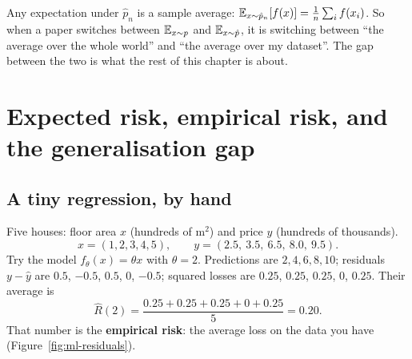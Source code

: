 \begin{intuitionbox}
Any expectation under $\hat p_n$ is a sample average:
$\operatorname{\mathbb{E}}_{x\sim\hat p_n}[f(x)] = \frac1n\sum_i f(x_i)$. So when a paper switches between
$\operatorname{\mathbb{E}}_{x\sim p}$ and $\operatorname{\mathbb{E}}_{x\sim\hat p}$, it is switching between ``the average over the whole
world'' and ``the average over my dataset''. The gap between the two is what the rest of this
chapter is about.
\end{intuitionbox}

\section{Expected risk, empirical risk, and the generalisation gap}
\label{sec:ml-risk}

\subsection{A tiny regression, by hand}

Five houses: floor area $x$ (hundreds of m$^2$) and price $y$ (hundreds of thousands).
\[
x = (1,2,3,4,5),\qquad y = (2.5,\ 3.5,\ 6.5,\ 8.0,\ 9.5).
\]
Try the model $f_\theta(x)=\theta x$ with $\theta=2$. Predictions are $2,4,6,8,10$; residuals
$y-\hat y$ are $0.5$, $-0.5$, $0.5$, $0$, $-0.5$; squared losses are $0.25$, $0.25$, $0.25$, $0$, $0.25$.
Their average is
\[
\hat R(2) = \frac{0.25+0.25+0.25+0+0.25}{5} = 0.20 .
\]
That number is the \textbf{empirical risk}: the average loss on the data you have
(Figure~\ref{fig:ml-residuals}).

